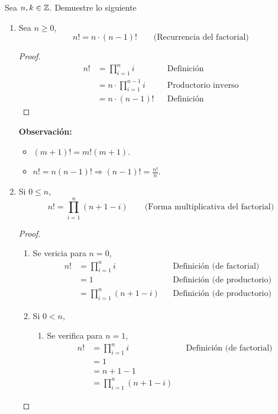 Sea $n,k\in \mathbb{Z}$. Demuestre lo siguiente
\begin{enumerate}[label=\alph*)]
  \item Sea $n\geq 0$, \[n! = n\cdot (n-1)! \qquad \text{(Recurrencia del factorial)}\]
  \begin{proof}\leavevmode
    \begin{align*}
      n! &= \prod_{i=1}^{n} i && \text{Definición}\\
      &= n\cdot \prod_{i=1}^{n-1} i && \text{Productorio inverso}\\
      &= n\cdot (n-1)! && \text{Definición}
    \end{align*}
  \end{proof}
  \textbf{Observación:}
  \begin{itemize}
    \item $(m+1)! = m!(m+1)$.
    \item $n! = n(n-1)! \Rightarrow (n-1)! = \frac{n!}{n}$.
  \end{itemize}
  
  \item Si $0\leq n$, \[n! = \prod_{i=1}^n (n+1-i) \qquad \text{(Forma multiplicativa del factorial)}\]
  
  \begin{proof}\leavevmode
    \begin{enumerate}[label=\Roman*)]
      \item Se vericia para $n=0$,
      \begin{align*}
        n! &= \prod_{i=1}^n i && \text{Definición (de factorial)}\\
        &= 1 && \text{Definición (de productorio)}\\
        &= \prod_{i=1}^n (n+1-i) && \text{Definición (de productorio)}
      \end{align*}
      
      \item Si $0<n$,
      \begin{enumerate}[label=\roman*)]
        \item Se verifica para $n=1$,
        \begin{align*}
          n! &= \prod_{i=1}^n i && \text{Definición (de factorial)}\\
          &= 1 \\
          &= n + 1 - 1 \\
          &= \prod_{i=1}^n (n+1-i)
        \end{align*}
        

\end{enumerate}
\end{enumerate}
\end{proof}
\end{enumerate}
